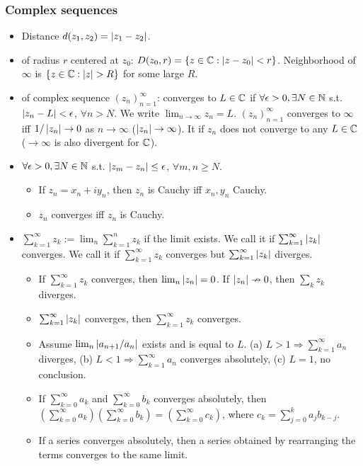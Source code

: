 \documentclass[10pt,a4paper]{book}
\begin{document}
\subsubsection{Complex sequences}\label{sec:complex-seq}
\begin{itemize}
	\item Distance $d(z_1,z_2)=\left\lvert z_1-z_2\right\rvert$.
	\item {} of radius $r$ centered at $z_0$: $D(z_0,r)=\{z\in\mathbb C : \left\lvert z-z_0\right\rvert<r\}$. Neighborhood of $\infty $ is $\{z\in\mathbb C:\left\lvert z\right\rvert>R\}$ for some large $R$.   
	\item {} of complex sequence $(z_n)_{n=1}^\infty $: converges to $L\in\mathbb C$ if $\forall \epsilon>0, \exists N\in\mathbb N $ s.t. $\left\lvert z_n-L\right\rvert<\epsilon$, $\forall n>N$. We write $\lim_{n\to \infty }z_n=L$. $(z_n)_{n=1}^\infty$ converges to $\infty $ iff $1/\left\lvert z_n\right\rvert\to 0$ as $n\to \infty $ ($\left\lvert z_n\right\rvert\to \infty $). It  if $z_n$ does not converge to any $L\in\mathbb C$ ($\to \infty $ is also divergent for $\mathbb C$).
	\item {} $\forall \epsilon>0,\exists N\in\mathbb N$ s.t. $\left\lvert z_m-z_n\right\rvert\leq \epsilon$, $\forall m,n\geq N$.
	\begin{itemize}
		\item If $z_n=x_n+i y_n$, then $z_n$ is Cauchy iff $x_n,y_n$ Cauchy.
		\item $z_n$ converges iff $z_n$ is Cauchy.     
	\end{itemize}                
	\item {} $\sum_{k=1}^{\infty }z_k :=\lim_{n} \sum_{k=1}^{n}z_k$ if the limit exists. We call it  if $\sum_{k=1}^{\infty }\left\lvert z_k\right\rvert$ converges. We call it  if $\sum_{k=1}^{\infty }z_k$ converges but $\sum_{k=1}^{\infty }\left\lvert z_k\right\rvert$ diverges.  
	\begin{itemize}
		\item {} If $\sum_{k=1}^{\infty }z_k$ converges, then $\lim_{n}\left\lvert z_n\right\rvert=0$. If $\left\lvert z_n\right\rvert\nrightarrow 0$, then $\sum_{k}z_k$ diverges.
		\item {} $\sum_{k=1}^{\infty }\left\lvert z_k\right\rvert$ converges, then $\sum_{k=1}^{\infty }z_k$ converges.     
		\item {} Assume $\lim_{n}\left\lvert a_{n+1}/a_n\right\rvert$ exists and is equal to $L$. (a) $L>1\Rightarrow\sum_{k=1}^{\infty }a_n $ diverges, (b)  $L<1\Rightarrow\sum_{k=1}^{\infty }a_n $ converges absolutely, (c) $L=1$, no conclusion.
		\item If $\sum_{k=0}^{\infty }a_k$ and $\sum_{k=0}^{\infty }b_k$ converges absolutely, then $(\sum_{k=0}^{\infty }a_k)(\sum_{k=0}^{\infty }b_k)=(\sum_{k=0}^{\infty }c_k)$, where $c_k=\sum_{j=0}^{k}a_j b_{k-j}$.
		\item If a series converges absolutely, then a series obtained by rearranging the terms converges to the same limit.    
	\end{itemize} 
\end{itemize}
\end{document}
